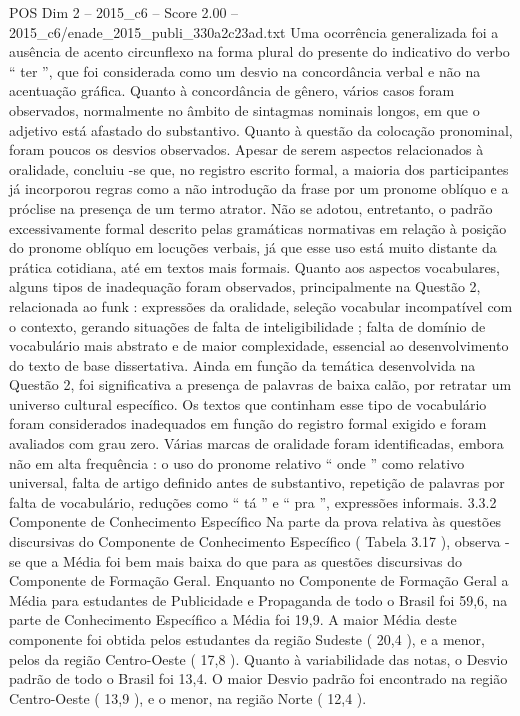\begin{textsample}{POS Dim 2 – 2015\_c6 – Score 2.00 – 2015\_c6/enade\_2015\_publi\_330a2c23ad.txt}
Uma ocorrência generalizada foi a ausência de acento circunflexo na forma plural do presente do indicativo do verbo “ ter ”, que foi considerada como um desvio na concordância verbal e não na acentuação gráfica.
Quanto à concordância de gênero, vários casos foram observados, normalmente no âmbito de sintagmas nominais longos, em que o adjetivo está afastado do substantivo.
Quanto à questão da colocação pronominal, foram poucos os desvios observados.
Apesar de serem aspectos relacionados à oralidade, concluiu -se que, no registro escrito formal, a maioria dos participantes já incorporou regras como a não introdução da frase por um pronome oblíquo e a próclise na presença de um termo atrator.
Não se adotou, entretanto, o padrão excessivamente formal descrito pelas gramáticas normativas em relação à posição do pronome oblíquo em locuções verbais, já que esse uso está muito distante da prática cotidiana, até em textos mais formais.
Quanto aos aspectos vocabulares, alguns tipos de inadequação foram observados, principalmente na Questão 2, relacionada ao funk : expressões da oralidade, seleção vocabular incompatível com o contexto, gerando situações de falta de inteligibilidade ; falta de domínio de vocabulário mais abstrato e de maior complexidade, essencial ao desenvolvimento do texto de base dissertativa.
Ainda em função da temática desenvolvida na Questão 2, foi significativa a presença de palavras de baixa calão, por retratar um universo cultural específico.
Os textos que continham esse tipo de vocabulário foram considerados inadequados em função do registro formal exigido e foram avaliados com grau zero.
Várias marcas de oralidade foram identificadas, embora não em alta frequência : o uso do pronome relativo “ onde ” como relativo universal, falta de artigo definido antes de substantivo, repetição de palavras por falta de vocabulário, reduções como “ tá ” e “ pra ”, expressões informais. 3.3.2 Componente de Conhecimento Específico Na parte da prova relativa às questões discursivas do Componente de Conhecimento Específico ( Tabela 3.17 ), observa -se que a Média foi bem mais baixa do que para as questões discursivas do Componente de Formação Geral.
Enquanto no Componente de Formação Geral a Média para estudantes de Publicidade e Propaganda de todo o Brasil foi 59,6, na parte de Conhecimento Específico a Média foi 19,9.
A maior Média deste componente foi obtida pelos estudantes da região Sudeste ( 20,4 ), e a menor, pelos da região Centro-Oeste ( 17,8 ).
Quanto à variabilidade das notas, o Desvio padrão de todo o Brasil foi 13,4.
O maior Desvio padrão foi encontrado na região Centro-Oeste ( 13,9 ), e o menor, na região Norte ( 12,4 ).

\end{textsample}

